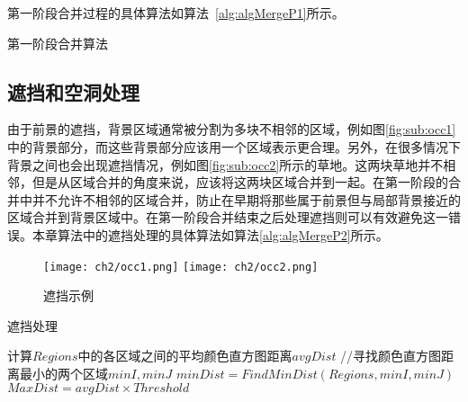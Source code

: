 第一阶段合并过程的具体算法如算法~\ref{alg:algMergeP1}所示。



\renewcommand{\algorithmcfname}{算法}
\begin{algorithm}[htb]
\LinesNumbered
{}
\caption{第一阶段合并算法}
\label{alg:algMergeP1}

\end{algorithm}

\subsection{遮挡和空洞处理}
\label{subsec:mergeP2}

由于前景的遮挡，背景区域通常被分割为多块不相邻的区域，例如图\ref{fig:sub:occ1}中的背景部分，而这些背景部分应该用一个区域表示更合理。另外，在很多情况下背景之间也会出现遮挡情况，例如图\ref{fig:sub:occ2}所示的草地。这两块草地并不相邻，但是从区域合并的角度来说，应该将这两块区域合并到一起。在第一阶段的合并中并不允许不相邻的区域合并，防止在早期将那些属于前景但与局部背景接近的区域合并到背景区域中。在第一阶段合并结束之后处理遮挡则可以有效避免这一错误。本章算法中的遮挡处理的具体算法如算法\ref{alg:algMergeP2}所示。
\begin{figure}[htb]
  \centering%
    {\texttt{[image: ch2/occ1.png]}}%
 \hspace{1em}%
      {\texttt{[image: ch2/occ2.png]}}

  \caption{遮挡示例}
  \label{fig:occ}
\end{figure}

\renewcommand{\algorithmcfname}{算法}
\begin{algorithm}[!htbp]
\caption{遮挡处理}
\label{alg:algMergeP2}
\LinesNumbered
{}
    计算$Regions$中的各区域之间的平均颜色直方图距离$avgDist$\;
    //寻找颜色直方图距离最小的两个区域$minI,minJ$\;
    $minDist = FindMinDist(Regions,minI,minJ)$\;
    $MaxDist = avgDist \times Threshold$\;



\end{algorithm}
\par

